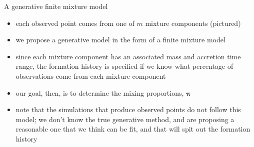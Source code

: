 \documentclass{beamer}
\newcommand{\vect}[1]{\boldsymbol{\mathbf{#1}}}
\newcommand{\vp}{\vect{\pi}}
\begin{document}
\begin{frame}[shrink]{A generative finite mixture model}
	
	\begin{itemize}
		
		
		\item each observed point comes from one of $m$ mixture components (pictured)
		\item we propose a generative model in the form of a finite mixture model
		\item since each mixture component has an associated mass and accretion time range, the formation history is specified if we know what percentage of observations come from each mixture component
		\item our goal, then, is to determine the mixing proportions, $\vp$
		
		\item note that the simulations that produce observed points do not follow this model; we don't know the true generative method, and are proposing a reasonable one that we think can be fit, and that will spit out the formation history
	\end{itemize}
	
\end{frame}
\end{document}
